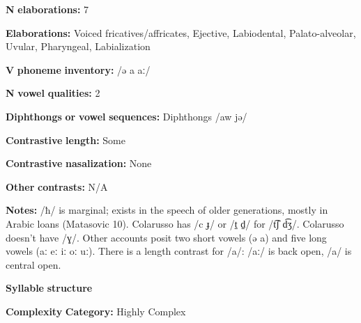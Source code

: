 \documentclass[output=paper]{langsci/langscibook}
\begin{document}
\begin{styleBody}
\textbf{N} \textbf{elaborations:} 7
\end{styleBody}

\begin{styleBody}
\textbf{Elaborations:} Voiced fricatives/affricates, Ejective, Labiodental, Palato-alveolar, Uvular, Pharyngeal, Labialization
\end{styleBody}

\begin{styleBody}
\textbf{V} \textbf{phoneme} \textbf{inventory:} /ə a aː/
\end{styleBody}

\begin{styleBody}
\textbf{N} \textbf{vowel} \textbf{qualities:} 2
\end{styleBody}

\begin{styleBody}
\textbf{Diphthongs} \textbf{or} \textbf{vowel} \textbf{sequences:} Diphthongs /aw jə/
\end{styleBody}

\begin{styleBody}
\textbf{Contrastive} \textbf{length:} Some
\end{styleBody}

\begin{styleBody}
\textbf{Contrastive} \textbf{nasalization:} None
\end{styleBody}

\begin{styleBody}
\textbf{Other} \textbf{contrasts:} N/A
\end{styleBody}

\begin{styleBody}
\textbf{Notes:} /ħ/ is marginal; exists in the speech of older generations, mostly in Arabic loans (Matasovic 10). Colarusso has /c ɟ/ or /t̠ d̠/ for /t͡ʃ d͡ʒ/. Colarusso doesn’t have /ɣ/. Other accounts posit two short vowels (ə a) and five long vowels (aː eː iː oː uː). There is a length contrast for /a/: /aː/ is back open, /a/ is central open.
\end{styleBody}

\begin{styleBody}
\textbf{Syllable} \textbf{structure}
\end{styleBody}

\begin{styleBody}
\textbf{Complexity} \textbf{Category:} Highly Complex
\end{styleBody}
\end{document}
